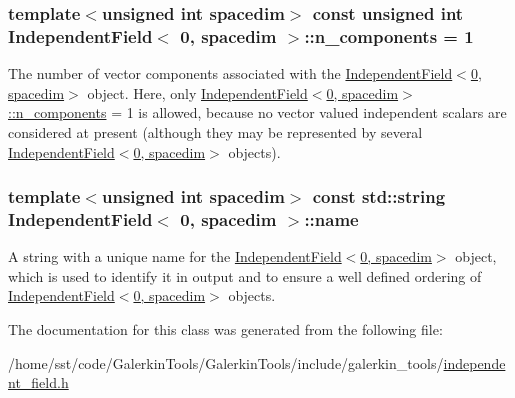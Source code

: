 \subsubsection[{\texorpdfstring{n\+\_\+components}{n_components}}]{\setlength{\rightskip}{0pt plus 5cm}template$<$unsigned int spacedim$>$ const unsigned int {\bf Independent\+Field}$<$ 0, spacedim $>$\+::n\+\_\+components = 1}\hypertarget{class_independent_field_3_010_00_01spacedim_01_4_a248c2226570c71914f5219e7e3052561}{}\label{class_independent_field_3_010_00_01spacedim_01_4_a248c2226570c71914f5219e7e3052561}
The number of vector components associated with the \hyperlink{class_independent_field_3_010_00_01spacedim_01_4}{Independent\+Field$<$0, spacedim$>$} object. Here, only \hyperlink{class_independent_field_3_010_00_01spacedim_01_4_a248c2226570c71914f5219e7e3052561}{Independent\+Field$<$0, spacedim$>$\+::n\+\_\+components} = 1 is allowed, because no vector valued independent scalars are considered at present (although they may be represented by several \hyperlink{class_independent_field_3_010_00_01spacedim_01_4}{Independent\+Field$<$0, spacedim$>$} objects). 
\subsubsection[{\texorpdfstring{name}{name}}]{\setlength{\rightskip}{0pt plus 5cm}template$<$unsigned int spacedim$>$ const std\+::string {\bf Independent\+Field}$<$ 0, spacedim $>$\+::name}\hypertarget{class_independent_field_3_010_00_01spacedim_01_4_a05ecdcc8310253f055fbc59abaa2bc90}{}\label{class_independent_field_3_010_00_01spacedim_01_4_a05ecdcc8310253f055fbc59abaa2bc90}
A string with a unique name for the \hyperlink{class_independent_field_3_010_00_01spacedim_01_4}{Independent\+Field$<$0, spacedim$>$} object, which is used to identify it in output and to ensure a well defined ordering of \hyperlink{class_independent_field_3_010_00_01spacedim_01_4}{Independent\+Field$<$0, spacedim$>$} objects. 

The documentation for this class was generated from the following file\+:\begin{DoxyCompactItemize}
\item 
/home/sst/code/\+Galerkin\+Tools/\+Galerkin\+Tools/include/galerkin\+\_\+tools/\hyperlink{independent__field_8h}{independent\+\_\+field.\+h}\end{DoxyCompactItemize}
